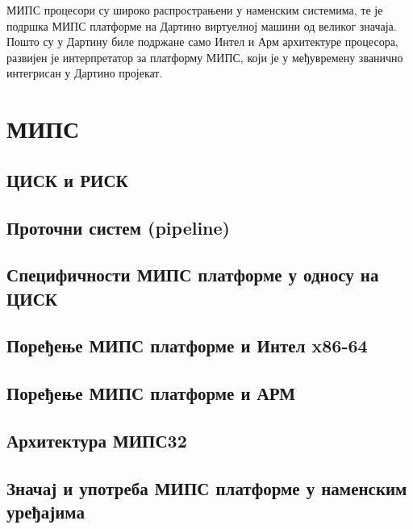 \documentclass[12pt,oneside]{memoir}
\begin{document}
МИПС процесори су широко распрострањени у наменским системима, те је подршка МИПС платформе на Дартино виртуелној машини од великог значаја. Пошто су у Дартину биле подржане само Интел и Арм архитектуре процесора, развијен је интерпретатор за платформу МИПС, који је у међувремену званично интегрисан у Дартино пројекат.\\




\chapter{МИПС}
\label{chp:mips}

\section{ЦИСК и РИСК}

\section{Проточни систем (pipeline)}

\section{Специфичности МИПС платформе у односу на ЦИСК}

\section{Поређење МИПС платформе и Интел x86-64}

\section{Поређење МИПС платформе и АРМ}

\section{Архитектура МИПС32}

\section{Значај и употреба МИПС платформе у наменским уређајима}
\end{document}
